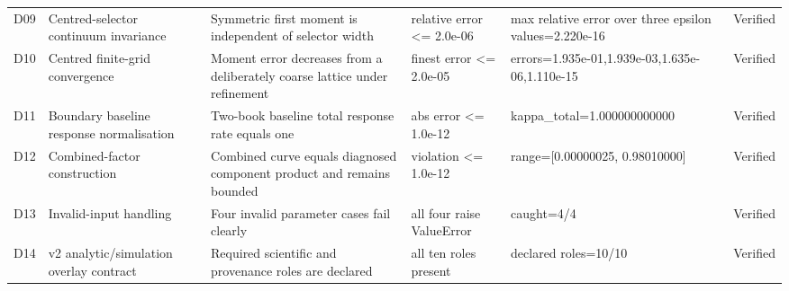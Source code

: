 \begin{table}[H]
\begin{tabularx}{\linewidth}{@{}p{0.9cm}p{3.6cm}X p{3.0cm}X p{1.8cm}@{}}
D09 & Centred-selector continuum invariance & Symmetric first moment is independent of selector width & relative error <= 2.0e-06 & max relative error over three epsilon values=2.220e-16 & Verified \\
D10 & Centred finite-grid convergence & Moment error decreases from a deliberately coarse lattice under refinement & finest error <= 2.0e-05 & errors=1.935e-01,1.939e-03,1.635e-06,1.110e-15 & Verified \\
D11 & Boundary baseline response normalisation & Two-book baseline total response rate equals one & abs error <= 1.0e-12 & kappa\_total=1.000000000000 & Verified \\
D12 & Combined-factor construction & Combined curve equals diagnosed component product and remains bounded & violation <= 1.0e-12 & range=[0.00000025, 0.98010000] & Verified \\
D13 & Invalid-input handling & Four invalid parameter cases fail clearly & all four raise ValueError & caught=4/4 & Verified \\
D14 & v2 analytic/simulation overlay contract & Required scientific and provenance roles are declared & all ten roles present & declared roles=10/10 & Verified \\
\bottomrule
\end{tabularx}
\end{table}
